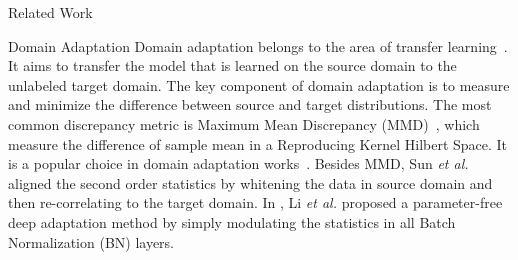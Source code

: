 \begin{section}{Related Work}
\begin{paragraph}{Domain Adaptation}
Domain adaptation belongs to the area of transfer learning~\cite{pan2010survey}. It aims to transfer the model that is learned on the source domain to the unlabeled target domain. The key component of domain adaptation is to measure and minimize the difference between source and target distributions. The most common discrepancy metric is Maximum Mean Discrepancy (MMD)~\cite{mmd}, which measure the difference of sample mean in a Reproducing Kernel Hilbert Space. It is a popular choice in domain adaptation works~\cite{ddc,dan,long2016unsupervised}. Besides MMD, Sun \emph{et al.}~\cite{coral} aligned the second order statistics by whitening the data in source domain and then re-correlating to the target domain. In \cite{adabn}, Li \emph{et al.} proposed a parameter-free deep adaptation method by simply modulating the statistics in all Batch Normalization (BN) layers.
\end{paragraph}


\end{section}
